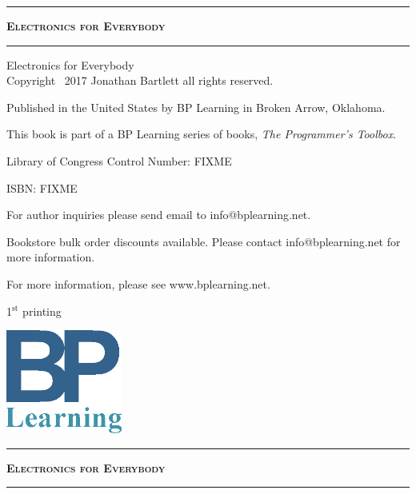 \begin{titlepage}

\thispagestyle{empty}
\vspace*{\fill}
\begin{center}
\hrule
{\LARGE \textsc{\textbf{Electronics for Everybody}}}
\baselineskip
\hrule
\end{center}
\vspace*{\fill}

\clearpage %

\thispagestyle{empty}
\vspace*{\fill}

{\small
Electronics for Everybody \\

Copyright \textcopyright\ 2017 Jonathan Bartlett all rights reserved.

Published in the United States by BP Learning in Broken Arrow, Oklahoma.

This book is part of a BP Learning series of books, \textit{The Programmer's Toolbox}.

Library of Congress Control Number: FIXME

ISBN: FIXME

For author inquiries please send email to info@bplearning.net.  

Bookstore bulk order discounts available.  Please contact info@bplearning.net for more information.

For more information, please see www.bplearning.net.

1$^{\textrm{st}}$ printing
}
\baselineskip

\includegraphics[width=1.5in]{bplearning.png}


\vspace*{\fill}

\clearpage %

\thispagestyle{empty}
\vspace*{\fill}
\begin{center}
\hrule
{\LARGE \textsc{\textbf{Electronics for Everybody}}}
\baselineskip
\hrule
{}\baselineskip
{\Large \textsc{\\ %
}}


\end{center}
\end{titlepage}
